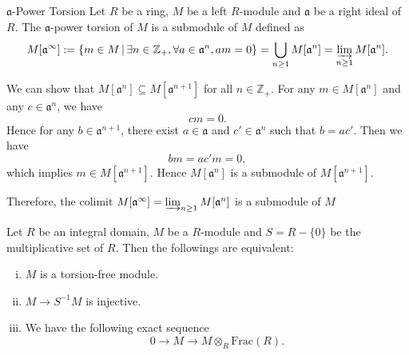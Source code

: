 \begin{definition}{$\mathfrak{a}$-Power Torsion}{}
    Let $R$ be a ring, $M$ be a left $R$-module and $\mathfrak{a}$ be a right ideal of $R$. The $\mathfrak{a}$-power torsion of $M$ is a submodule of $M$ defined as
    \[
        M[\mathfrak{a}^\infty]:=\left\{m\in M\,\middle\vert\, \exists n\in \mathbb{Z}_+, \forall a\in \mathfrak{a}^n, am=0\right\}=\bigcup_{n \ge 1}M[\mathfrak{a}^n]=\varinjlim_{n\ge 1}M[\mathfrak{a}^n].
    \]
\end{definition}
\begin{prf}
  We can show that $M[\mathfrak{a}^n]\subseteq M[\mathfrak{a}^{n+1}]$ for all $n\in \mathbb{Z}_+$. For any $m\in M[\mathfrak{a}^n]$ and any $c \in \mathfrak{a}^n$, we have
    \[
        c m = 0.
\]
Hence for any $b \in \mathfrak{a}^{n+1}$, there exist $a \in \mathfrak{a}$ and $c' \in \mathfrak{a}^n$ such that $b = a c'$. Then we have
\[
    b m = a c' m = 0 ,
\]
which implies $m\in M[\mathfrak{a}^{n+1}]$. Hence $M[\mathfrak{a}^n]$ is a submodule of $M[\mathfrak{a}^{n+1}]$.
  \begin{center}
  \end{center}
  Therefore, the colimit $M[\mathfrak{a}^\infty]=\varinjlim_{n\ge 1}M[\mathfrak{a}^n]$ is a submodule of $M$
\end{prf}

\begin{proposition}{}{}
    Let $R$ be an integral domain, $M$ be a $R$-module and $S=R-\{0\}$ be the multiplicative set of $R$. Then the followings are equivalent:
    \begin{enumerate}[(i)]
        \item $M$ is a torsion-free module.
        \item $M\to S^{-1}M$ is injective.
        \item We have the following exact sequence
        \[
            0\longrightarrow M\longrightarrow M\otimes_R \mathrm{Frac}(R).
        \]
    \end{enumerate}
\end{proposition}


